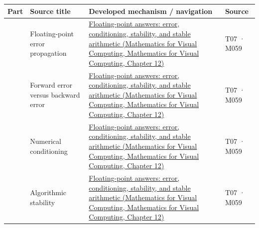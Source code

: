 {\def\LTcaptype{none} %
\begin{longtable}[]{@{}
  >{\raggedleft\arraybackslash}p{}
  >{\raggedright\arraybackslash}p{}
  >{\raggedright\arraybackslash}p{}
  >{\raggedright\arraybackslash}p{}@{}}
\toprule\noalign{}
\begin{minipage}[b]{\linewidth}\raggedleft
Part
\end{minipage} & \begin{minipage}[b]{\linewidth}\raggedright
Source title
\end{minipage} & \begin{minipage}[b]{\linewidth}\raggedright
Developed mechanism / navigation
\end{minipage} & \begin{minipage}[b]{\linewidth}\raggedright
Source
\end{minipage} \\
\midrule\noalign{}
\endhead
\bottomrule\noalign{}
\endlastfoot
966 & Floating-point error propagation & \href{../02-Mathematics-for-Visual-Computing/main.pdf\#nameddest=02-foundations-ii-ch028-floating-point-answers-error-conditioning-stability-and-stable-arithmetic}{Floating-point answers: error, conditioning, stability, and stable arithmetic (Mathematics for Visual Computing, Mathematics for Visual Computing, Chapter 12)} & T07 · M059 \\
967 & Forward error versus backward error & \href{../02-Mathematics-for-Visual-Computing/main.pdf\#nameddest=02-foundations-ii-ch028-floating-point-answers-error-conditioning-stability-and-stable-arithmetic}{Floating-point answers: error, conditioning, stability, and stable arithmetic (Mathematics for Visual Computing, Mathematics for Visual Computing, Chapter 12)} & T07 · M059 \\
968 & Numerical conditioning & \href{../02-Mathematics-for-Visual-Computing/main.pdf\#nameddest=02-foundations-ii-ch028-floating-point-answers-error-conditioning-stability-and-stable-arithmetic}{Floating-point answers: error, conditioning, stability, and stable arithmetic (Mathematics for Visual Computing, Mathematics for Visual Computing, Chapter 12)} & T07 · M059 \\
969 & Algorithmic stability & \href{../02-Mathematics-for-Visual-Computing/main.pdf\#nameddest=02-foundations-ii-ch028-floating-point-answers-error-conditioning-stability-and-stable-arithmetic}{Floating-point answers: error, conditioning, stability, and stable arithmetic (Mathematics for Visual Computing, Mathematics for Visual Computing, Chapter 12)} & T07 · M059 \\

\end{longtable}}
